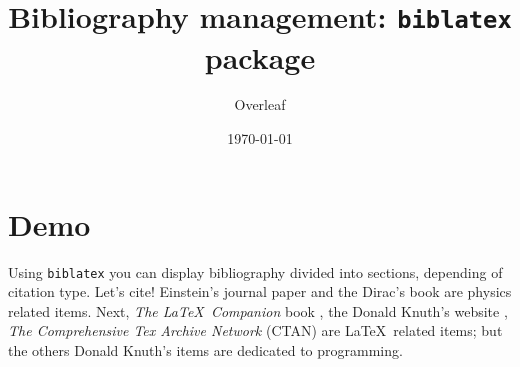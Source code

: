 \documentclass[12pt,a4paper]{article}
\title{Bibliography management: \texttt{biblatex} package}
\author{Overleaf}
\date{\today}
\begin{document}
\maketitle

\tableofcontents

\section{Demo}
Using \texttt{biblatex} you can display bibliography divided into sections,
depending of citation type.
Let's cite! Einstein's journal paper \cite{einstein} and the Dirac's
book \cite{dirac} are physics related items.
Next, \textit{The \LaTeX\ Companion} book \cite{latexcompanion}, the Donald
Knuth's website \cite{knuthwebsite}, \textit{The Comprehensive Tex Archive
Network} (CTAN) \cite{ctan} are \LaTeX\ related items; but the others Donald
Knuth's items \cite{knuth-fa} are dedicated to programming.

\medskip


%

\printbibliography[heading=bibintoc,title={Whole bibliography}]
\end{document}
